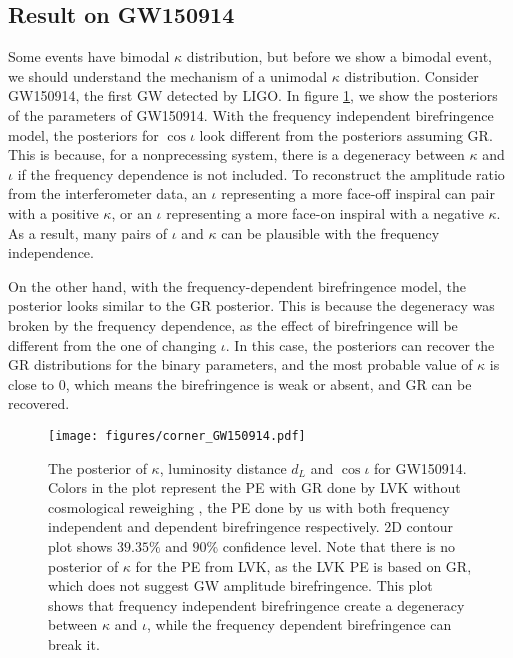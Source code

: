 \documentclass[aps,prd,twocolumn,superscriptaddress,preprintnumbers,floatfix,nofootinbib]{revtex4-2}
\begin{document}



\subsection{Result on GW150914}
Some events have bimodal $\kappa$ distribution, but before we show a bimodal event, we should understand the mechanism of a unimodal $\kappa$ distribution.
Consider GW150914, the first GW detected by LIGO.
In figure \ref{fig:corner_GW150914}, we show the posteriors of the parameters of GW150914.
With the frequency independent birefringence model, the posteriors for $\cos\iota$ look different from the posteriors assuming GR.
This is because, for a nonprecessing system, there is a degeneracy between $\kappa$ and $\iota$ if the frequency dependence is not included.
To reconstruct the amplitude ratio from the interferometer data, an $\iota$ representing a more face-off inspiral can pair with a positive $\kappa$, or an $\iota$ representing a more face-on inspiral with a negative $\kappa$.
As a result, many pairs of $\iota$ and $\kappa$ can be plausible with the frequency independence.

On the other hand, with the frequency-dependent birefringence model, the posterior looks similar to the GR posterior.
This is because the degeneracy was broken by the frequency dependence, as the effect of birefringence will be different from the one of changing $\iota$.
In this case, the posteriors can recover the GR distributions for the binary parameters,
and the most probable value of $\kappa$ is close to $0$, which means the birefringence is weak or absent, and GR can be recovered.

\begin{figure}[h]
    \texttt{[image: figures/corner\_GW150914.pdf]}
    \caption{
        The posterior of $\kappa$, luminosity distance $d_L$ and $\cos{\iota}$ for GW150914.
        Colors in the plot represent the PE with GR done by LVK without cosmological reweighing \citep{GWTC-2.1, GWTC-3}, the PE done by us with both frequency independent and dependent birefringence respectively.
        2D contour plot shows $39.35\%$ and $90\%$ confidence level.
        Note that there is no posterior of $\kappa$ for the PE from LVK, as the LVK PE is based on GR, which does not suggest GW amplitude birefringence.
        This plot shows that frequency independent birefringence create a degeneracy between $\kappa$ and $\iota$, while the frequency dependent birefringence can break it.
    }
    \label{fig:corner_GW150914}
\end{figure}
\end{document}

